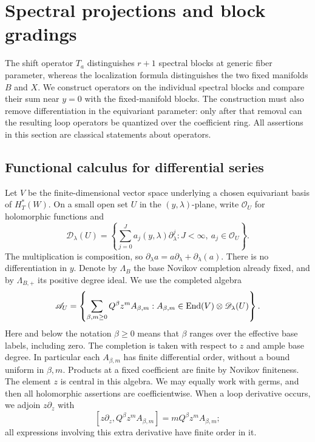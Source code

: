 \section{Spectral projections and block gradings}
\label{spec:section}

The shift operator $T_a$ distinguishes $r+1$ spectral blocks at generic
fiber parameter, whereas the localization formula distinguishes the two fixed
manifolds $B$ and $X$.  We construct operators on the individual spectral
blocks and compare their sum near $y=0$ with the fixed-manifold blocks.
The construction must also remove differentiation in the equivariant
parameter: only after that removal can the resulting loop operators be
quantized over the coefficient ring.  All assertions in this section are
classical statements about operators.

\subsection{Functional calculus for differential series}

Let $V$ be the finite-dimensional vector space underlying a chosen
equivariant basis of $H_T^*(W)$.  On a small open set $U$ in the
$(y,\lambda)$-plane, write $\mathcal O_U$ for holomorphic functions and
\[
 \mathscr D_\lambda(U)
 =\left\{\sum_{j=0}^{J}a_j(y,\lambda)\partial_\lambda^j:
                 J<\infty,\ a_j\in\mathcal O_U\right\}.
\]
The multiplication is composition, so
$\partial_\lambda a=a\partial_\lambda+\partial_\lambda(a)$.
There is no differentiation in $y$.  Denote by $\Lambda_B$ the base
Novikov completion already fixed, and by $\Lambda_{B,+}$ its positive
degree ideal.  We use the completed algebra
\begin{equation}
 \mathscr A_U
 =\left\{\sum_{\beta,m\geq0}Q^\beta z^m A_{\beta,m}:
      A_{\beta,m}\in\operatorname{End}(V)\otimes\mathscr D_\lambda(U)\right\}.
 \label{spec:algebra}
\end{equation}
Here and below the notation $\beta\geq0$ means that $\beta$ ranges over
the effective base labels, including zero.  The completion is taken with
respect to $z$ and ample base degree.  In particular each
$A_{\beta,m}$ has finite differential order, without a bound uniform in
$\beta,m$.  Products at a fixed coefficient are finite by Novikov
finiteness.  The element $z$ is central in this algebra.  We may equally
work with germs, and then all holomorphic assertions are coefficientwise.
When a loop derivative occurs, we adjoin $z\partial_z$ with
\[
 [z\partial_z,Q^\beta z^m A_{\beta,m}]
                =mQ^\beta z^m A_{\beta,m};
\]
all expressions involving this extra derivative have finite order in it.


